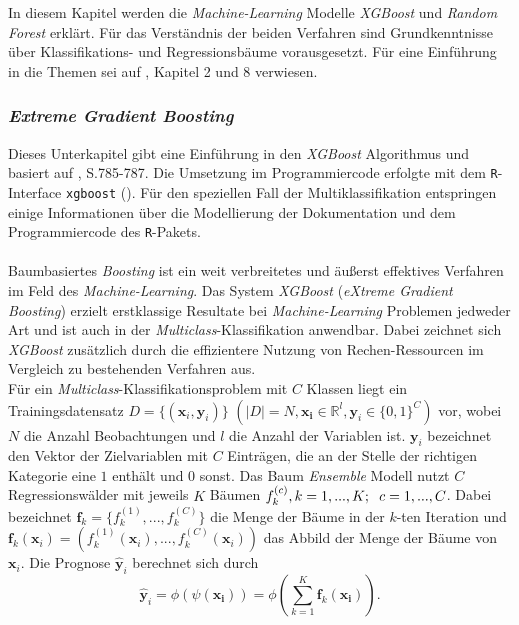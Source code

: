 \documentclass[a4paper,11pt]{article}
\begin{document}
In diesem Kapitel werden die \textit{Machine-Learning} Modelle \textit{XGBoost} und \textit{Random Forest} erklärt. Für das Verständnis der beiden Verfahren sind Grundkenntnisse über Klassifikations- und Regressionsbäume vorausgesetzt. Für eine Einführung in die Themen sei auf \cite{CART}, Kapitel 2 und 8 verwiesen.


\subsubsection{\textit{Extreme Gradient Boosting}}\label{kap:XG}

Dieses Unterkapitel gibt eine Einführung in den \textit{XGBoost} Algorithmus und basiert auf \cite{XGBoost}, S.785-787. Die Umsetzung im Programmiercode erfolgte mit dem \texttt{R}-Interface \texttt{xgboost} (\cite{XGBoostR}). Für den speziellen Fall der Multiklassifikation entspringen einige Informationen über die Modellierung der Dokumentation und dem Programmiercode des \texttt{R}-Pakets.\\
\\
Baumbasiertes \textit{Boosting} ist ein weit verbreitetes und äußerst effektives Verfahren im Feld des \textit{Machine-Learning}. Das System \textit{XGBoost} (\textit{eXtreme Gradient Boosting}) erzielt erstklassige Resultate bei \textit{Machine-Learning} Problemen jedweder Art und ist auch in der \textit{Multi\-class}-Klassifikation anwendbar. Dabei zeichnet sich \textit{XGBoost} zusätzlich durch die effizientere Nutzung von Rechen-Ressourcen im Vergleich zu bestehenden Verfahren aus. \\
Für ein \textit{Multiclass}-Klassifikationsproblem mit $C$ Klassen liegt ein Trainingsdatensatz $D = \{(\bm{x}_i, \bm{y}_i) \}$ $(|D| = N, \bm{x_i} \in \mathbb{R}^l, \bm{y}_i \in \{0,1\}^C)$ vor, wobei $N$ die Anzahl Beobachtungen und $l$ die Anzahl der Variablen ist. $\bm{y}_i$ bezeichnet den Vektor der Zielvariablen mit $C$ Einträgen, die an der Stelle der richtigen Kategorie eine $1$ enthält und $0$ sonst. Das Baum \textit{Ensemble} Modell nutzt $C$ Regressionswälder mit jeweils $K$ Bäumen $f_k^{(c)}, k=1,...,K ;\hspace{0.2cm} c = 1,...,C$. Dabei bezeichnet $\bm{f}_k = \{f_k^{(1)},...,f_k^{(C)}\}$ die Menge der Bäume in der $k$-ten Iteration und $\bm{f}_k(\bm{x}_i) = (f_k^{(1)}(\bm{x}_i),...,f_k^{(C)}(\bm{x}_i))$ das Abbild der Menge der Bäume von $\bm{x}_i$. Die Prognose $\hat{\bm{y}}_i$ berechnet sich durch
\begin{equation}\label{eq:0}
    \hat{\bm{y}}_i = \phi(\psi(\bm{x_i})) = \phi( \sum_{k=1}^K \bm{f}_k(\bm{x_i})).
\end{equation}{}
\end{document}
